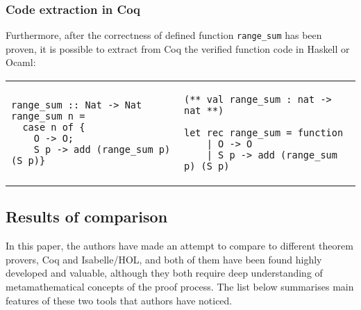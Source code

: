 \documentclass[article]{aaltoseries}
\begin{document}
\subsubsection{Code extraction in Coq}
Furthermore, after the correctness of defined function \texttt{range\_sum} has been proven, it is possible to extract from Coq the verified function code in Haskell or Ocaml:

\begin{raggedleft}
\begin{tabular}{p{} p{}}
\begin{lstlisting}[caption={Extracted function in Haskell}]
range_sum :: Nat -> Nat
range_sum n =
  case n of {
    O -> O;
    S p -> add (range_sum p) (S p)}
\end{lstlisting} %
&
\begin{lstlisting}[caption={Extracted function in OCaml}]
(** val range_sum : nat -> nat **)

let rec range_sum = function
    | O -> O
    | S p -> add (range_sum p) (S p)
\end{lstlisting}
\end{tabular}
\end{raggedleft}





\subsection{Results of comparison}
\label{sec:joint_comparison}

In this paper, the authors have made an attempt to compare to different theorem provers, Coq and Isabelle/HOL, and both of them have been found highly developed and valuable, although they both require deep understanding of metamathematical concepts of the proof process. The list below summarises main features of these two tools that authors have noticed.
\end{document}
